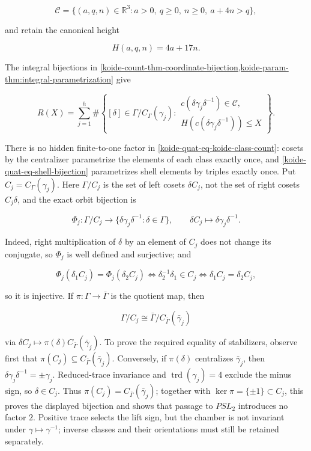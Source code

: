 \[
 \mathcal C=\{(a,q,n)\in\mathbb R^3:
 a>0,\ q\ge0,\ n\ge0,\ a+4n>q\},
\]

and retain the canonical height

\[
 H(a,q,n)=4a+17n.
\]

The integral bijections in
\cref{koide-count-thm-coordinate-bijection,koide-param-thm:integral-parametrization}
give

\begin{equation}\label{koide-quat-eq-koide-class-count}
 \boxed{
 R(X)=\sum_{j=1}^h
 \#\left\{
 [\delta]\in\Gamma/C_\Gamma(\gamma_j):
 \begin{array}{l}
 c(\delta\gamma_j\delta^{-1})\in\mathcal C,\\
 H(c(\delta\gamma_j\delta^{-1}))\le X
 \end{array}
 \right\}.}
\end{equation}

There is no hidden finite-to-one factor in
\eqref{koide-quat-eq-koide-class-count}: cosets by the centralizer
parametrize the elements of each class exactly once, and
\eqref{koide-quat-eq-shell-bijection} parametrizes shell elements by triples
exactly once.  Put \(C_j=C_\Gamma(\gamma_j)\).  Here
\(\Gamma/C_j\) is the set of left cosets \(\delta C_j\), not the set of
right cosets \(C_j\delta\), and the exact orbit bijection is

\[
 \Phi_j:\Gamma/C_j\longrightarrow
 \{\delta\gamma_j\delta^{-1}:\delta\in\Gamma\},
 \qquad
 \delta C_j\longmapsto\delta\gamma_j\delta^{-1}.
\]

Indeed, right multiplication of \(\delta\) by an element of \(C_j\) does
not change its conjugate, so \(\Phi_j\) is well defined and surjective; and

\[
 \Phi_j(\delta_1C_j)=\Phi_j(\delta_2C_j)
 \iff \delta_2^{-1}\delta_1\in C_j
 \iff \delta_1C_j=\delta_2C_j,
\]

so it is injective.  If \(\pi:\Gamma\to\bar\Gamma\) is the quotient map,
then

\[
 \Gamma/C_j
 \cong
 \bar\Gamma/C_{\bar\Gamma}(\bar\gamma_j)
\]

via \(\delta C_j\mapsto\pi(\delta)C_{\bar\Gamma}(\bar\gamma_j)\).
To prove the required equality of stabilizers, observe first that
\(\pi(C_j)\subseteq C_{\bar\Gamma}(\bar\gamma_j)\).  Conversely, if
\(\pi(\delta)\) centralizes \(\bar\gamma_j\), then
\(\delta\gamma_j\delta^{-1}=\pm\gamma_j\).  Reduced-trace invariance and
\(\operatorname{trd}(\gamma_j)=4\) exclude the minus sign, so
\(\delta\in C_j\).  Thus
\(\pi(C_j)=C_{\bar\Gamma}(\bar\gamma_j)\); together with
\(\ker\pi=\{\pm1\}\subset C_j\), this proves the displayed bijection and
shows that passage to \(PSL_2\) introduces no factor \(2\). Positive trace
selects the lift sign, but the chamber is not invariant under
\(\gamma\mapsto\gamma^{-1}\); inverse classes and their orientations must
still be retained separately.

